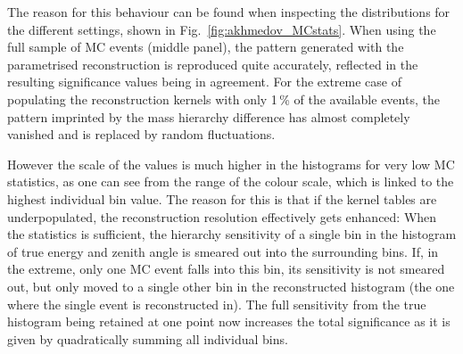 The reason for this behaviour can be found when inspecting the \delchi
distributions for the different settings, shown in
Fig.~\ref{fig:akhmedov_MCstats}. When using the full sample of MC events
(middle panel), the pattern generated with the parametrised reconstruction is
reproduced quite accurately, reflected in the resulting significance values
being in agreement. For the extreme case of populating the reconstruction
kernels with only 1\,\% of the available events, the pattern imprinted by the
mass hierarchy difference has almost completely vanished and is replaced by
random fluctuations.

However the scale of the \delchi values is much higher in the histograms for
very low MC statistics, as one can see from the range of the colour scale,
which is linked to the highest individual bin value. 
The reason for this is that if the kernel tables are underpopulated, the 
reconstruction resolution effectively gets enhanced: When the statistics is 
sufficient, the hierarchy sensitivity of a single bin in the histogram of true 
energy and zenith angle is smeared out into the surrounding bins. If, in the 
extreme, only one MC event falls into this bin, its sensitivity is not smeared 
out, but only moved to a single other bin in the reconstructed histogram (the 
one where the single event is reconstructed in). The full sensitivity from 
the true histogram being retained at one point now increases the total 
significance as it is given by quadratically summing all individual 
bins.



